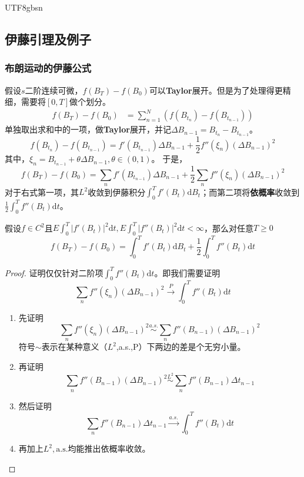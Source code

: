 \documentclass{article}
\begin{document}
\begin{CJK*}{UTF8}{gbsn}
\subsection{伊藤引理及例子}
\subsubsection{布朗运动的伊藤公式}
假设$s$二阶连续可微，$f(B_T)-f(B_0)$可以\textbf{Taylor}展开。但是为了处理得更精细，需要将$[0,T]$做个划分。
$$
\begin{aligned}
    f(B_T)-f(B_0)
    &=\sum_{n=1}^N(f(B_{t_n})-f(B_{t_{n-1}}))
\end{aligned}
$$
单独取出求和中的一项，做\textbf{Taylor}展开，并记$\Delta B_{{n-1}}=B_{t_n}-B_{t_{n-1}}$。
$$
f(B_{t_n})-f(B_{t_{n-1}})=f'(B_{t_{n-1}})\Delta B_{{n-1}}+\frac{1}{2}f''(\xi_{n})(\Delta B_{{n-1}})^2
$$
其中，$\xi_n=B_{t_{n-1}}+\theta\Delta B_{{n-1}},\theta\in(0,1)$。
于是，
$$
f(B_T)-f(B_0)=\sum_nf'(B_{t_{n-1}})\Delta B_{{n-1}}+\frac{1}{2}\sum_nf''(\xi_{n})(\Delta B_{{n-1}})^2
$$
对于右式第一项，其$L^2$收敛到伊藤积分$\int_0^Tf'(B_t)\mathrm{d}B_t$；而第二项将\textbf{依概率}收敛到$\frac{1}{2}\int_0^Tf''(B_t)\mathrm{d}t$。


\begin{theorem}
假设$f\in C^2$且$E\int_0^T|f'(B_t)|^2\mathrm{d}t,E\int_0^T|f''(B_t)|^2\mathrm{d}t<\infty$，那么对任意$T\ge0$
    $$
    f(B_T)-f(B_0)=\int_0^Tf'(B_t)\mathrm{d}B_t+\frac{1}{2}\int_0^Tf''(B_t)\mathrm{d}t
    $$
\end{theorem}
\begin{proof}
证明仅仅针对二阶项$\int_0^Tf''(B_t)\mathrm{d}t$。即我们需要证明
$$
\sum_n f''(\xi_{n})(\Delta B_{{n-1}})^2
\stackrel{P}{\to}\int_0^Tf''(B_t)\mathrm{d}t
$$
\begin{enumerate}
    \item 先证明
    $$\sum_n f''(\xi_{n})(\Delta B_{{n-1}})^2\stackrel{a.s.}{\sim}\sum_n f''(B_{n-1})(\Delta B_{{n-1}})^2$$符号$\sim$表示在某种意义（$L^2$,a.s.,P）下两边的差是个无穷小量。
    \item 再证明
    $$\sum_n f''(B_{n-1})(\Delta B_{{n-1}})^2\stackrel{L^2}{\sim}\sum_n f''(B_{n-1})\Delta t_{{n-1}}$$
    \item 然后证明
    $$
    \sum_n f''(B_{n-1})\Delta t_{{n-1}}\stackrel{a.s.}{\to}\int_0^Tf''(B_t)\mathrm{d}t
    $$
    \item 再加上$L^2,\text{a.s.}$均能推出依概率收敛。
\end{enumerate}
\end{proof}


\end{CJK*}
\end{document}
